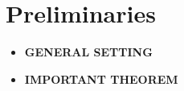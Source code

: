 \section*{Preliminaries}
\begin{itemize}
	\item \textbf{GENERAL SETTING}
	
	\item \textbf{IMPORTANT THEOREM}
\end{itemize} 